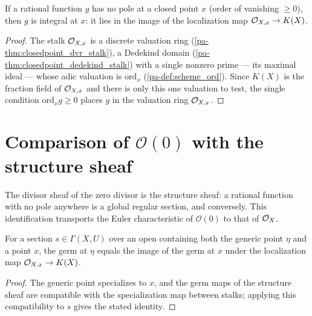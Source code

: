 \begin{lemma}
  \label{pa-lem:exists_stalk_of_ord_le_one}
  \leanok

  If a rational function \(g\) has no pole at a closed point \(x\) (order of vanishing \(\ge 0\)),
  then \(g\) is integral at \(x\): it lies in the image of the localization map
  \(\mathcal{O}_{X,x} \to K(X)\).
\end{lemma}
\begin{proof}
  \leanok
  The stalk \(\mathcal{O}_{X,x}\) is a discrete valuation ring (\ref{pa-thm:closedpoint_dvr_stalk}), a
  Dedekind domain (\ref{pa-thm:closedpoint_dedekind_stalk}) with a single nonzero prime --- its
  maximal ideal --- whose adic valuation is \(\mathrm{ord}_x\) (\ref{pa-def:scheme_ord}). Since
  \(K(X)\) is the fraction field of \(\mathcal{O}_{X,x}\) and there is only this one valuation to test,
  the single condition \(\mathrm{ord}_x g \ge 0\) places \(g\) in the valuation ring
  \(\mathcal{O}_{X,x}\).
\end{proof}

\section{Comparison of \(\mathcal O(0)\) with the structure sheaf}

The divisor sheaf of the zero divisor is the structure sheaf: a rational function with no pole
anywhere is a global regular section, and conversely. This identification transports the Euler
characteristic of \(\mathcal O(0)\) to that of \(\mathcal{O}_{X}\).

\begin{lemma}
  \label{pa-lem:germ_generic_eq_algebraMap_germ}
  \leanok

  For a section \(s \in \Gamma(X, U)\) over an open containing both the generic point \(\eta\) and a
  point \(x\), the germ at \(\eta\) equals the image of the germ at \(x\) under the localization map
  \(\mathcal{O}_{X,x} \to K(X)\).
\end{lemma}
\begin{proof}
  \leanok
  The generic point specializes to \(x\), and the germ maps of the structure sheaf are compatible
  with the specialization map between stalks; applying this compatibility to \(s\) gives the stated
  identity.
\end{proof}

